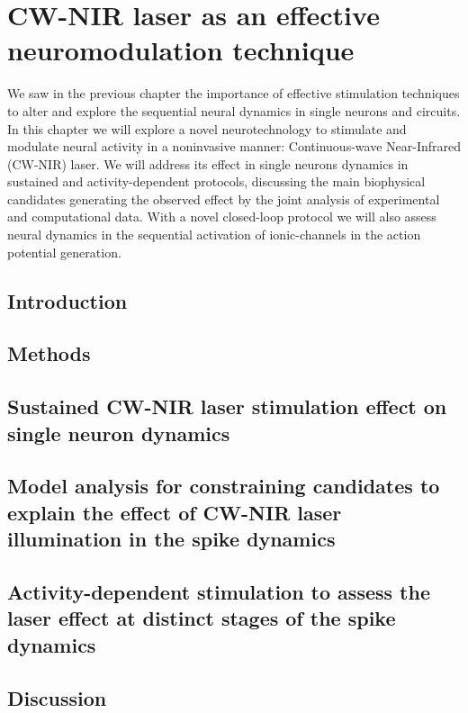 \chapter{CW-NIR laser as an effective neuromodulation technique}
\label{c-laser}

We saw in the previous chapter the importance of effective stimulation techniques to alter and explore the sequential neural dynamics in single neurons and circuits. In this chapter we will explore a novel neurotechnology to stimulate and modulate neural activity in a  noninvasive manner: Continuous-wave Near-Infrared (CW-NIR) laser. We will address its effect in single neurons dynamics in sustained and activity-dependent protocols, discussing the main biophysical candidates generating the  observed effect by the joint analysis of experimental and computational data. With a novel closed-loop protocol we will also assess  neural dynamics in the sequential activation of ionic-channels in the action potential generation. 

\section{Introduction}
\label{sect:intro} 



\section{Methods}



\section{Sustained CW-NIR laser stimulation effect on single neuron dynamics}
\label{sec:sustained effect}


\section{Model analysis for constraining candidates to explain the effect of CW-NIR laser illumination in the spike dynamics}
\label{sec:laser models}


\section{Activity-dependent stimulation to assess the laser effect at distinct stages of the spike dynamics} 
\label{sec:activity dependent}



\section{Discussion}
